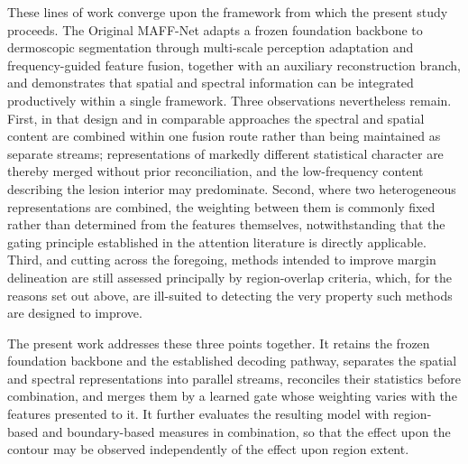 These lines of work converge upon the framework from which the present study proceeds. The Original MAFF-Net \cite{ref15} adapts a frozen foundation backbone to dermoscopic segmentation through multi-scale perception adaptation and frequency-guided feature fusion, together with an auxiliary reconstruction branch, and demonstrates that spatial and spectral information can be integrated productively within a single framework. Three observations nevertheless remain. First, in that design and in comparable approaches the spectral and spatial content are combined within one fusion route rather than being maintained as separate streams; representations of markedly different statistical character are thereby merged without prior reconciliation, and the low-frequency content describing the lesion interior may predominate. Second, where two heterogeneous representations are combined, the weighting between them is commonly fixed rather than determined from the features themselves, notwithstanding that the gating principle established in the attention literature is directly applicable. Third, and cutting across the foregoing, methods intended to improve margin delineation are still assessed principally by region-overlap criteria, which, for the reasons set out above, are ill-suited to detecting the very property such methods are designed to improve.

The present work addresses these three points together. It retains the frozen foundation backbone and the established decoding pathway, separates the spatial and spectral representations into parallel streams, reconciles their statistics before combination, and merges them by a learned gate whose weighting varies with the features presented to it. It further evaluates the resulting model with region-based and boundary-based measures in combination, so that the effect upon the contour may be observed independently of the effect upon region extent.
